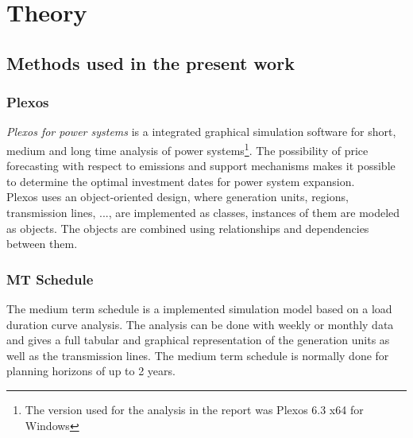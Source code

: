 \documentclass{article}
\begin{document}
\section{Theory}
\subsection{Methods used in the present work}
\subsubsection{Plexos}
\textit{Plexos for power systems} is a integrated graphical simulation software for short, medium and long time analysis of power systems\footnote{The version used for the analysis in the report was Plexos 6.3 x64 for Windows}. The possibility of price forecasting with respect to emissions and support mechanisms makes it possible to determine the optimal investment dates for power system expansion.\\
Plexos uses an object-oriented design, where generation units, regions, transmission lines, ..., are implemented as classes, instances of them are modeled as objects. The objects are combined using relationships and dependencies between them.
\subsubsection{MT Schedule}
The medium term schedule is a implemented simulation model based on a load duration curve analysis. The analysis can be done with weekly or monthly data and gives a full tabular and graphical representation of the generation units as well as the transmission lines. The medium term schedule is normally done for planning horizons of up to 2 years.
\end{document}
